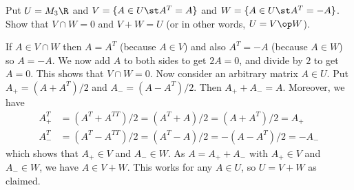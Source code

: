 \begin{exercise}\label{ex-trace-free-symmetric}
 Put $U=M_3\R$ and $V=\{A\in U\st A^T=A\}$ and
 $W=\{A\in U\st A^T=-A\}$.  Show that $V\cap W=0$ and
 $V+W=U$ (or in other words, $U=V\op W$). 
\end{exercise}
\begin{solution}
 If $A\in V\cap W$ then $A=A^T$ (because $A\in V$) and also
 $A^T=-A$ (because $A\in W$) so $A=-A$.  We now add $A$ to
 both sides to get $2A=0$, and divide by $2$ to get $A=0$. 
 This shows that $V\cap W=0$.  Now consider an arbitrary
 matrix $A\in U$.  Put $A_+=(A+A^T)/2$ and $A_-=(A-A^T)/2$. 
 Then $A_++A_-=A$.  Moreover, we have 
 \begin{align*}
  A_+^T &=(A^T+A^{TT})/2=(A^T+A)/2=(A+A^T)/2 = A_+ \\
  A_-^T &=(A^T-A^{TT})/2=(A^T-A)/2=-(A-A^T)/2 = -A_-
 \end{align*}
 which shows that $A_+\in V$ and $A_-\in W$.  As $A=A_++A_-$
 with $A_+\in V$ and $A_-\in W$, we have $A\in V+W$.  This
 works for any $A\in U$, so $U=V+W$ as claimed. 
\end{solution}

\closegraphsfile




